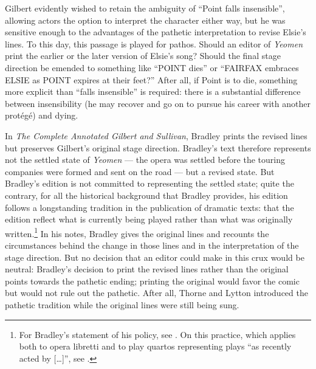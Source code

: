 \begin{paper}
\noindent Gilbert evidently wished to retain the ambiguity of ``Point falls
insensible'', allowing actors the option to interpret the character
either way, but he was sensitive enough to the advantages of the
pathetic interpretation to revise Elsie's lines. To this day, this
passage is played for pathos. Should an editor of \emph{Yeomen} print the earlier or the later version
of Elsie's song? Should the final stage direction be emended to
something like ``POINT dies'' or ``FAIRFAX embraces ELSIE as POINT
expires at their feet?'' After all, if Point is to die, something more
explicit than ``falls insensible'' is required: there is a substantial
difference between insensibility (he may recover and go on to pursue his
career with another protégé) and dying.

In \emph{The Complete Annotated Gilbert and Sullivan}, Bradley prints
the revised lines but preserves Gilbert's original stage direction.
Bradley's text therefore represents not the settled state of
\emph{Yeomen} --- the opera was settled before the touring companies were
formed and sent on the road --- but a revised state. But Bradley's
edition is not committed to representing the settled state; quite the
contrary, for all the historical background that Bradley provides, his
edition follows a longstanding tradition in the publication of dramatic
texts: that the edition reflect what is currently being played rather
than what was originally written.\footnote{For Bradley's statement of
  his policy, see \citealt[xii]{bradley_ian_complete_1996}. On this practice, which applies
  both to opera libretti and to play quartos representing plays ``as
  recently acted by {[}\ldots{}{]}'', see \citealt[34--40]{broude_performance_2011}.} In his
notes, Bradley gives the original lines and recounts the circumstances
behind the change in those lines and in the interpretation of the stage
direction. But no decision that an editor could make in this crux would
be neutral: Bradley's decision to print the revised lines rather than
the original points towards the pathetic ending; printing the original
would favor the comic but would not rule out the pathetic. After all,
Thorne and Lytton introduced the pathetic tradition while the original
lines were still being sung.


\end{paper}
